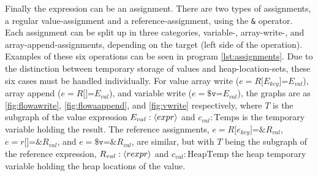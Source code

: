 Finally the expression can be an assignment. There are two types of assignments, a regular value-assignment and a reference-assignment, using the \texttt{\&} operator. Each assignment can be split up in three categories, variable-, array-write-, and array-append-assignments, depending on the target (left side of the operation). Examples of these six operations can be seen in program \ref{lst:assignments}. Due to the distinction between temporary storage of values and heap-location-sets, these six cases must be handled individually. For value array write ($e = R\texttt{[$E_{key}$]=} E_{val}$), array append ($e = R\texttt{[]=} E_{val}$), and variable write ($e = \texttt{\$v=} E_{val}$), the graphs are as \ref{fig:flowawrite}, \ref{fig:flowaappend}, and \ref{fig:vwrite} respectively, where $T$ is the subgraph of the value expression $E_{val} : \langle expr\rangle$ and $c_{val} : \text{Temps}$ is the temporary variable holding the result. The reference assignments,  $e = R\texttt{[$e_{key}$]=\&} R_{val}$, $e = r\texttt{[]=\&} R_{val}$, and $e = \texttt{\$v=\&} R_{val}$, are similar, but with $T$ being the subgraph of the reference expression, $R_{val} : \langle rexpr\rangle$ and $c_{val} : \text{HeapTemp}$ the heap temporary variable holding the heap locations of the value.

